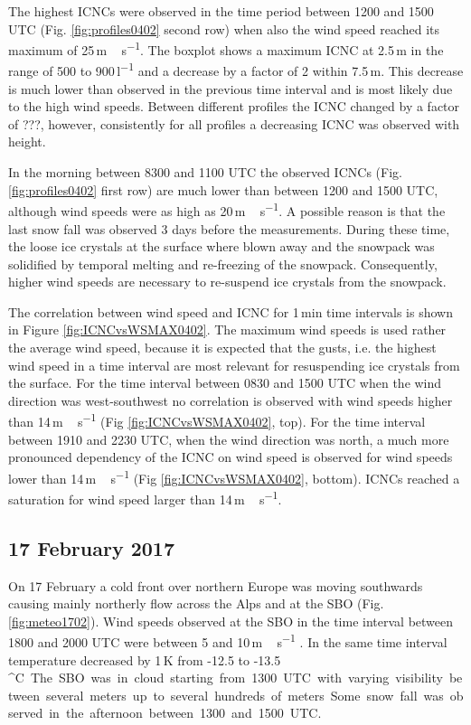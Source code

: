 \documentclass[draft,linenumbers]{agujournal}
\begin{document}
The highest ICNCs were observed in the time period between 1200 and 1500 UTC (Fig. \ref{fig:profiles0402} second row) when also the wind speed reached its maximum of 25\,\si{m\,s^{-1}}. The boxplot shows a maximum ICNC at 2.5\,\si{m} in the range of 500 to 900\,\si{l^{-1}} and a decrease by a factor of 2 within 7.5\,\si{m}. This decrease is much lower than observed in the previous time interval and is most likely due to the high wind speeds. Between different profiles the ICNC changed by a factor of ???, however, consistently for all profiles a decreasing ICNC was observed with height.

In the morning between 8300 and 1100 UTC the observed ICNCs (Fig. \ref{fig:profiles0402} first row) are much lower than between 1200 and 1500 UTC, although wind speeds were as high as 20\,\si{m\,s^{-1}}. A possible reason is that the last snow fall was observed 3 days before the measurements. During these time, the loose ice crystals at the surface where blown away and the snowpack was solidified by temporal melting and re-freezing of the snowpack. Consequently, higher wind speeds are necessary to re-suspend ice crystals from the snowpack. 

The correlation between wind speed and ICNC for 1\,\si{min} time intervals is shown in Figure \ref{fig:ICNCvsWSMAX0402}. The maximum wind speeds is used rather the average wind speed, because it is expected that the gusts, i.e. the highest wind speed in a time interval are most relevant for resuspending ice crystals from the surface. For the time interval between 0830 and 1500 UTC when the wind direction was west-southwest no correlation is observed with wind speeds higher than 14\,\si{m\,s^{-1}} (Fig \ref{fig:ICNCvsWSMAX0402}, top). For the time interval between 1910 and 2230 UTC, when the wind direction was north, a much more pronounced dependency of the ICNC on wind speed is observed for wind speeds lower than 14\,\si{m\,s^{-1}} (Fig \ref{fig:ICNCvsWSMAX0402}, bottom). ICNCs reached a saturation for wind speed larger than 14\,\si{m\,s^{-1}}.

\subsection{17 February 2017}
On 17 February a cold front over northern Europe was moving southwards causing mainly northerly flow across the Alps and at the SBO (Fig. \ref{fig:meteo1702}). Wind speeds observed at the SBO in the time interval between 1800 and 2000 UTC were between 5 and 10\,\si{m\,s^{-1}} . In the same time interval temperature decreased by 1\,\si{K} from -12.5 to -13.5\,\si{^\circ C}. The SBO was in cloud starting from 1300 UTC with varying visibility between several meters up to several hundreds of meters. Some snow fall was observed in the afternoon between 1300 and 1500 UTC. 
\end{document}
